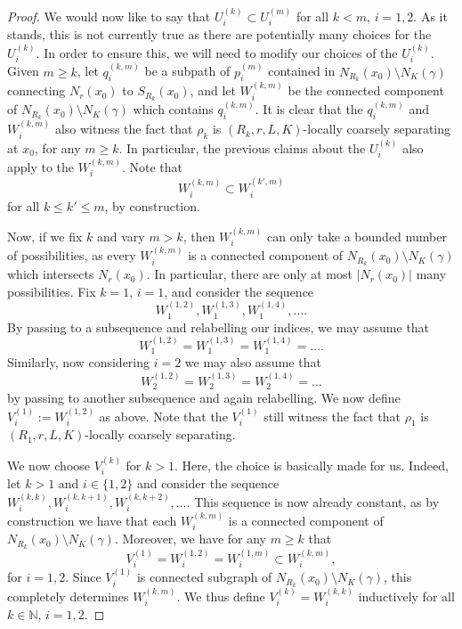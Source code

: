 \documentclass[10pt,a4paper]{amsart}
\newcommand{\N}{\mathbb{N}}
\theoremstyle{definition}
\begin{document}
\begin{proof}
    We would now like to say that $U_i^{(k)} \subset U_i^{(m)}$ for all $k < m$, $i = 1,2$. As it stands, this is not currently true as there are potentially many choices for the $U_i^{(k)}$. In order to ensure this, we will need to modify our choices of the $U_i^{(k)}$. Given $m \geq k$, let $q_i^{(k,m)}$ be a subpath of $p_i^{(m)}$ contained in $N_{R_k}(x_0) \setminus N_K(\gamma)$ connecting $N_r(x_0)$ to $S_{R_k}(x_0)$, and let 
    $W_i^{(k,m)}$  be the connected component of $ N_{R_k}(x_0) \setminus N_K(\gamma)$ which contains $q_i^{(k,m)}$. 
    It is clear that the $q_i^{(k,m)}$ and $W_i^{(k,m)}$ also witness the fact that $\rho_k$ is $(R_k,r,L,K)$-locally coarsely separating at $x_0$, for any $m \geq k$. In particular, the previous claims about the $U_i^{(k)}$ also apply to the $W_i^{(k,m)}$. Note that 
    $$
    W_i^{(k,m)} \subset W_i^{(k',m)}
    $$
    for all $k \leq k' \leq m$, by construction. 
    
    Now, if we fix $k$ and vary $m > k$, then $W_i^{(k,m)}$ can only take a bounded number of possibilities, as every $W_i^{(k,m)}$ is a connected component of $N_{R_k}(x_0) \setminus N_K(\gamma)$ which intersects $N_r(x_0)$. In particular, there are only at most $|N_r(x_0)|$ many possibilities. Fix $k = 1$, $i =1$, and consider the sequence 
    $$
    W_1^{(1,2)}, W_1^{(1,3)},  W_1^{(1,4)}, \ldots. 
    $$
    By passing to a subsequence and relabelling our indices, we may assume that 
    $$
    W_1^{(1,2)} = W_1^{(1,3)}  = W_1^{(1,4)} =  \ldots. 
    $$
    Similarly, now considering $i = 2$ we may also assume that 
    $$
    W_2^{(1,2)} = W_2^{(1,3)}  = W_2^{(1,4)} =  \ldots
    $$
    by passing to another subsequence and again relabelling. We now define $V_i^{(1)} := W_i^{(1,2)}$ as above. Note that the $V_i^{(1)}$ still witness the fact that $\rho_1$ is $(R_1, r, L, K)$-locally coarsely separating. 

    
    We now choose $V_i^{(k)}$ for $k > 1$. Here, the choice is basically made for us. Indeed, let $k > 1$ and $i \in \{1,2\}$ and consider the sequence 
    $
    W_i^{(k,k)}, W_i^{(k,k+1)},  W_i^{(k,k+2)}, \ldots. 
    $ 
    This sequence is now already constant, as by construction we have that each $W_i^{(k,m)}$ is a connected component of $N_{R_k}(x_0) \setminus N_K(\gamma)$. Moreover, we have for any $m \geq k$ that
    $$
    V_i^{(1)} = W_i^{(1,2)} = W_i^{(1,m)} \subset W_i^{(k,m)},
    $$
    for $i = 1,2$. Since $V_i^{(1)}$ is connected subgraph of $N_{R_k}(x_0) \setminus N_K(\gamma)$, this completely determines $W_i^{(k,m)}$. We thus define  $V_i^{(k)} = W_i^{(k,k)}$ inductively for all $k \in \N$, $i = 1,2$. 
    

\end{proof}
\end{document}
